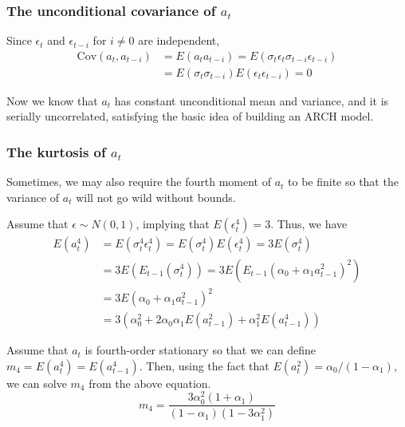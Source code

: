 \documentclass[a4paper,11pt]{article}
\newcommand{\cov}{\mathrm{Cov}}
\begin{document}
\subsubsection*{The unconditional covariance of \(a_t\)}
\label{sec:org6d47e40}

Since \(\epsilon_t\) and \(\epsilon_{t-i}\) for \(i \neq 0\) are independent,
\begin{equation*}
\begin{split}
\cov(a_t, a_{t-i}) &= E(a_t a_{t-i}) = E(\sigma_t \epsilon_t \sigma_{t-i} \epsilon_{t-i}) \\
&= E(\sigma_t \sigma_{t-i}) E(\epsilon_t \epsilon_{t-i}) = 0
\end{split}
\end{equation*}

Now we know that \(a_t\) has constant unconditional mean and variance,
and it is serially uncorrelated, satisfying the basic idea of building
an ARCH model.

\subsubsection*{The kurtosis of \(a_t\)}
\label{sec:orga14a8f5}

Sometimes, we may also require the fourth moment of \(a_t\) to be finite
so that the variance of \(a_t\) will not go wild without bounds.

Assume that \(\epsilon \sim N(0, 1)\), implying that \(E(\epsilon^4_t) =
3\). Thus, we have
\begin{equation*}
\begin{split}
E(a^4_t) &= E(\sigma^4_t \epsilon_t^4) = E(\sigma^4_t) E(\epsilon^4_t) = 3 E(\sigma^4_t) \\
&= 3 E\left( E_{t-1}(\sigma^4_t) \right) = 3 E\left( E_{t-1}(\alpha_0 + \alpha_1 a^2_{t-1})^2  \right) \\
&= 3 E(\alpha_0 + \alpha_1 a^2_{t-1})^2 \\
&= 3\left(\alpha^2_0 + 2\alpha_0\alpha_1 E(a^2_{t-1}) + \alpha^2_1 E(a^4_{t-1}) \right)
\end{split}
\end{equation*}

Assume that \(a_t\) is fourth-order stationary so that we can define
\(m_4 = E(a^4_t) = E(a^4_{t-1})\). Then, using the fact that \(E(a^2_t) =
\alpha_0 /(1-\alpha_1)\), we can solve \(m_4\) from the
above equation.
\[m_4 = \frac{3\alpha^2_0(1+\alpha_1)}{(1-\alpha_1)(1-3\alpha^2_1)} \]
\end{document}
